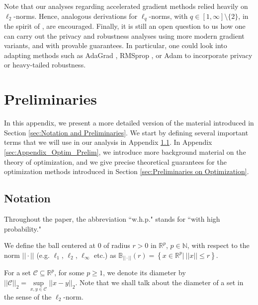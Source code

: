 \documentclass{article}
\begin{document}
Note that our analyses regarding accelerated gradient methods relied heavily on $\ell_2$-norms. Hence, analogous derivations for $\ell_q$-norms, with $q \in [1, \infty]\setminus\{2\}$, in the spirit of \cite{BasEtal21}, are encouraged.
Finally, it is still an open question to us how one can carry out the privacy and robustness analyses using more modern gradient variants, and with provable guarantees. In particular, one could look into adapting methods such as AdaGrad \cite{AdaGrad_Duchi_2011}, RMSprop \cite{RMSprop_2012}, or Adam \cite{Adam_2104} to incorporate privacy or heavy-tailed robustness.


\appendix


\section{Preliminaries}\label{sec:Appendix_Prelim}

In this appendix, we present a more detailed version of the material introduced in Section \ref{sec:Notation and Preliminaries}. We start by defining several important terms that we will use in our analysis in Appendix \ref{sec:Notation}. In Appendix \ref{sec:Appendix_Optim_Prelim}, we introduce more background material on the theory of optimization, and we give precise theoretical guarantees for the optimization methods introduced in Section \ref{sec:Preliminaries on Optimization}.


\subsection{Notation}\label{sec:Notation}
Throughout the paper, the abbreviation ``w.h.p." stands for ``with high probability."

We define the ball centered at $0$ of radius $r > 0$ in $\mathbb{R}^p$, $p \in \mathbb{N}$, with respect to the norm $||\cdot||$ (e.g. $\ell_1$, $\ell_2$, $\ell_{\infty}$ etc.) as $\mathbb{B}_{||\cdot||}(r) = \left\{x \in \mathbb{R}^p | \  ||x|| \leq r\right\}$.

For a set $\mathcal{C} \subseteq \mathbb{R}^p$, for some $p \geq 1$, we denote its diameter by $||\mathcal{C}||_2 = \mathop{\sup}\limits_{x, y \in \mathcal{C}}||x - y||_2$. Note that we shall talk about the diameter of a set in the sense of the $\ell_2$-norm.
\end{document}
